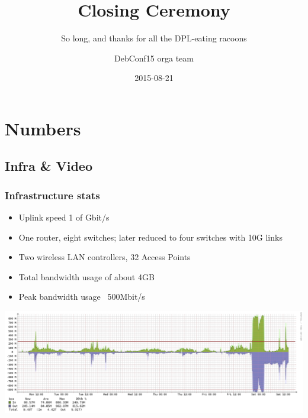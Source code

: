 \documentclass[t]{beamer}
\title{Closing Ceremony}
\subtitle{So long, and thanks for all the DPL-eating racoons}
\author{DebConf15 orga team}
\date{2015-08-21}
\begin{document}
\setcounter{tocdepth}{1}

\begin{frame}
	\titlepage
\end{frame}

\section{Numbers}


\subsection{Infra \& Video}

\begin{frame}
	\frametitle{Infrastructure stats}
	\begin{itemize}
		\item Uplink speed 1 of Gbit/s
		\item One router, eight switches; later reduced to four switches with 10G links
		\item Two wireless LAN controllers, 32 Access Points
		\item Total bandwidth usage of about 4GB
		\item Peak bandwidth usage ~500Mbit/s
	\end{itemize}
	\begin{center}
	\includegraphics[scale=0.2]{weekly2.pdf}
	\end{center}
\end{frame}
\end{document}
